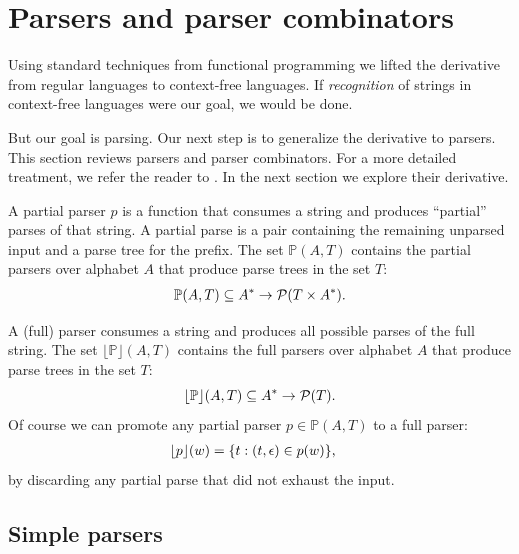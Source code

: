 \section{Parsers and parser combinators}
\label{sec:parsing}
%
Using standard techniques from functional programming we lifted the derivative
from regular languages to context-free languages.
%
If \emph{recognition} of strings in context-free languages were our goal, we
would be done.

But our goal is parsing.
%
Our next step is to generalize the derivative to parsers.
%
This section reviews parsers and parser combinators.
%
For a more detailed treatment, we refer the reader to \cite{mattmight:Swierstra:1998:Combinator,mattmight:Swierstra:2009:Tutorial}.
%
In the next section we explore their derivative.


A partial parser $p$ is a function that consumes a string and produces
``partial'' parses of that string.
%
A partial parse is a pair containing the remaining unparsed input and a parse
tree for the prefix.
%
The set $\mathbb{P}(A,T)$ contains the partial parsers
over alphabet $A$ that produce parse trees in the set $T$:
\begin{align*}
  \mathbb{P}(A,T) \subseteq
  A^* \to \mathcal{P}(T \times A^*)
  \text.
\end{align*}


A (full) parser consumes a string and produces all possible parses of the full
string.
%
The set $\lfloor \mathbb{P} \rfloor(A,T)$ contains
the full parsers over alphabet $A$ that produce parse trees in the set $T$:
%
\begin{equation*}
\lfloor
\mathbb{P}
\rfloor(A,T)
\subseteq
A^* \to 
\mathcal{P}(T)
\text.
\end{equation*}
%
Of course we can promote any partial parser 
$p \in \mathbb{P}(A,T)$
to a full parser:
\begin{align*}
\lfloor p \rfloor(w)
&
=
\{
t : (t,\epsilon) \in 
p(w)
\}
\text,
\end{align*}
by discarding any partial parse that did not exhaust the input.


\subsection{Simple parsers}

